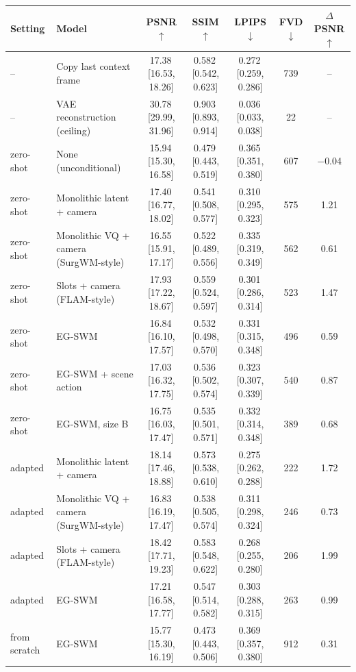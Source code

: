 \begin{tabular}{llccccc}
\toprule
Setting & Model & PSNR$\uparrow$ & SSIM$\uparrow$ & LPIPS$\downarrow$ & FVD$\downarrow$ & $\Delta$PSNR$\uparrow$ \\
\midrule
-- & Copy last context frame & 17.38\,{\scriptsize[16.53, 18.26]} & 0.582\,{\scriptsize[0.542, 0.623]} & 0.272\,{\scriptsize[0.259, 0.286]} & 739 & -- \\
-- & VAE reconstruction (ceiling) & 30.78\,{\scriptsize[29.99, 31.96]} & 0.903\,{\scriptsize[0.893, 0.914]} & 0.036\,{\scriptsize[0.033, 0.038]} & 22 & -- \\
\midrule
zero-shot & None (unconditional) & 15.94\,{\scriptsize[15.30, 16.58]} & 0.479\,{\scriptsize[0.443, 0.519]} & 0.365\,{\scriptsize[0.351, 0.380]} & 607 & $-$0.04 \\
zero-shot & Monolithic latent + camera & 17.40\,{\scriptsize[16.77, 18.02]} & 0.541\,{\scriptsize[0.508, 0.577]} & 0.310\,{\scriptsize[0.295, 0.323]} & 575 & 1.21 \\
zero-shot & Monolithic VQ + camera (SurgWM-style) & 16.55\,{\scriptsize[15.91, 17.17]} & 0.522\,{\scriptsize[0.489, 0.556]} & 0.335\,{\scriptsize[0.319, 0.349]} & 562 & 0.61 \\
zero-shot & Slots + camera (FLAM-style) & 17.93\,{\scriptsize[17.22, 18.67]} & 0.559\,{\scriptsize[0.524, 0.597]} & 0.301\,{\scriptsize[0.286, 0.314]} & 523 & 1.47 \\
zero-shot & EG-SWM & 16.84\,{\scriptsize[16.10, 17.57]} & 0.532\,{\scriptsize[0.498, 0.570]} & 0.331\,{\scriptsize[0.315, 0.348]} & 496 & 0.59 \\
zero-shot & EG-SWM + scene action & 17.03\,{\scriptsize[16.32, 17.75]} & 0.536\,{\scriptsize[0.502, 0.574]} & 0.323\,{\scriptsize[0.307, 0.339]} & 540 & 0.87 \\
zero-shot & EG-SWM, size B & 16.75\,{\scriptsize[16.03, 17.47]} & 0.535\,{\scriptsize[0.501, 0.571]} & 0.332\,{\scriptsize[0.314, 0.348]} & 389 & 0.68 \\
\midrule
adapted & Monolithic latent + camera & 18.14\,{\scriptsize[17.46, 18.88]} & 0.573\,{\scriptsize[0.538, 0.610]} & 0.275\,{\scriptsize[0.262, 0.288]} & 222 & 1.72 \\
adapted & Monolithic VQ + camera (SurgWM-style) & 16.83\,{\scriptsize[16.19, 17.47]} & 0.538\,{\scriptsize[0.505, 0.574]} & 0.311\,{\scriptsize[0.298, 0.324]} & 246 & 0.73 \\
adapted & Slots + camera (FLAM-style) & 18.42\,{\scriptsize[17.71, 19.23]} & 0.583\,{\scriptsize[0.548, 0.622]} & 0.268\,{\scriptsize[0.255, 0.280]} & 206 & 1.99 \\
adapted & EG-SWM & 17.21\,{\scriptsize[16.58, 17.77]} & 0.547\,{\scriptsize[0.514, 0.582]} & 0.303\,{\scriptsize[0.288, 0.315]} & 263 & 0.99 \\
\midrule
from scratch & EG-SWM & 15.77\,{\scriptsize[15.30, 16.19]} & 0.473\,{\scriptsize[0.443, 0.506]} & 0.369\,{\scriptsize[0.357, 0.380]} & 912 & 0.31 \\
\bottomrule
\end{tabular}

